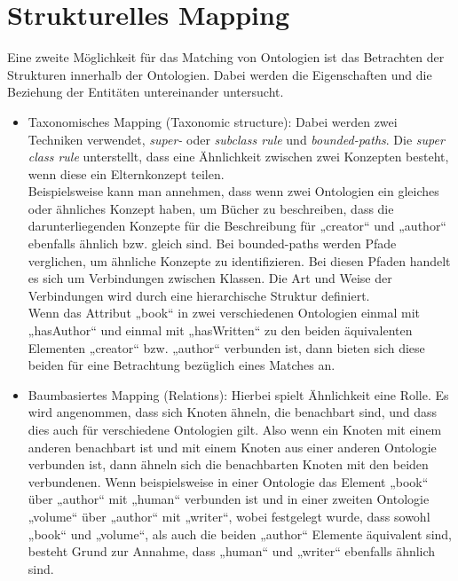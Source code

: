 	\section{Strukturelles Mapping}
	\label{StrukturellesMapping}
	Eine zweite Möglichkeit für das Matching von Ontologien ist das Betrachten der
	Strukturen innerhalb der Ontologien. Dabei werden die Eigenschaften und die
	Beziehung der Entitäten untereinander untersucht.
	\begin{itemize}
		\item Taxonomisches Mapping (Taxonomic structure): Dabei werden zwei Techniken
		verwendet, \textit{super-} oder  \textit{subclass rule} und
		\textit{bounded-paths}. Die \textit{super class rule} unterstellt, dass eine
		Ähnlichkeit zwischen zwei Konzepten besteht, wenn diese ein Elternkonzept
		teilen. \cite{EuzShv07}\\
		Beispielsweise kann man annehmen, dass wenn zwei
		Ontologien ein gleiches oder ähnliches Konzept haben, um Bücher zu
		beschreiben, dass die darunterliegenden Konzepte für die Beschreibung für
		„creator“ und „author“ ebenfalls ähnlich bzw. gleich sind. Bei bounded-paths
		werden Pfade verglichen, um ähnliche Konzepte zu identifizieren. Bei diesen
		Pfaden handelt es sich um Verbindungen zwischen Klassen. Die Art und Weise der
		Verbindungen wird durch eine hierarchische Struktur definiert.
		\cite{EuzShv07}\\
		Wenn das Attribut „book“ in zwei verschiedenen Ontologien
		einmal mit „hasAuthor“ und einmal mit „hasWritten“ zu den beiden äquivalenten
		Elementen „creator“ bzw. „author“ verbunden ist, dann bieten sich diese beiden
		für eine Betrachtung bezüglich eines Matches an.
		\item Baumbasiertes Mapping (Relations): Hierbei spielt Ähnlichkeit eine
		Rolle.
		Es wird angenommen, dass sich Knoten ähneln, die benachbart sind, und dass dies auch
		für verschiedene Ontologien gilt. Also wenn ein Knoten mit einem anderen
		benachbart ist und mit einem Knoten aus einer anderen Ontologie verbunden ist,
		dann ähneln sich die benachbarten Knoten mit den beiden verbundenen. Wenn
		beispielsweise in einer Ontologie das Element „book“ über „author“ mit „human“
		verbunden ist und in einer zweiten Ontologie „volume“ über „author“ mit
		„writer“, wobei festgelegt wurde, dass sowohl „book“ und „volume“, als auch
		die beiden „author“ Elemente äquivalent sind, besteht Grund zur Annahme, dass
		„human“ und „writer“ ebenfalls ähnlich sind.\cite{EuzShv07}
	\end{itemize}
	
